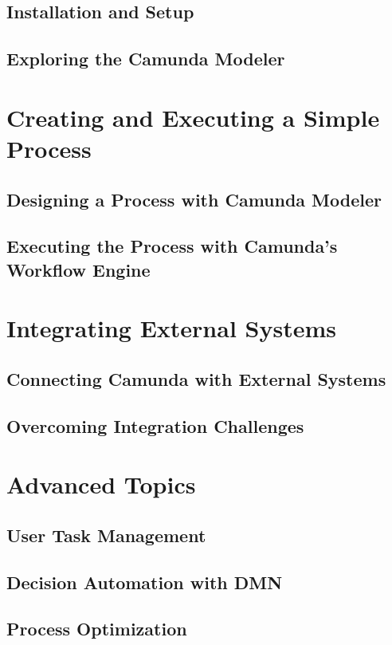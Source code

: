 \documentclass[12pt]{article}
\begin{document}
{  \subsection{Installation and Setup}
  \subsection{Exploring the Camunda Modeler}

\pagebreak

\section{Creating and Executing a Simple Process}
  \subsection{Designing a Process with Camunda Modeler}
  \subsection{Executing the Process with Camunda's Workflow Engine}

\pagebreak

\section{Integrating External Systems}
  \subsection{Connecting Camunda with External Systems}
  \subsection{Overcoming Integration Challenges}

\pagebreak

\section{Advanced Topics}
  \subsection{User Task Management}
  \subsection{Decision Automation with DMN}
  \subsection{Process Optimization}

}
\end{document}

